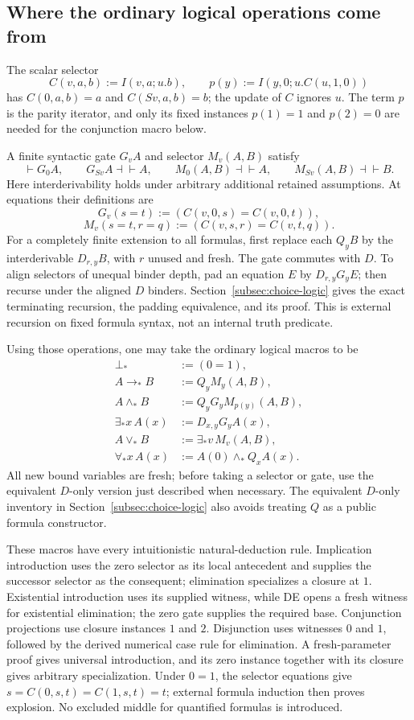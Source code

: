 \subsection{Where the ordinary logical operations come from}

The scalar selector
\[
 C(v,a,b):=I(v,a;u.b),\qquad
 p(y):=I(y,0;u.C(u,1,0))
\]
has $C(0,a,b)=a$ and $C(Sv,a,b)=b$; the update of $C$ ignores $u$.
The term $p$ is the parity iterator, and only its fixed instances
$p(1)=1$ and $p(2)=0$ are needed for the conjunction macro below.

A finite syntactic gate $G_vA$ and selector $M_v(A,B)$ satisfy
\[
 \vdash G_0A,\qquad G_{Sv}A\dashv\vdash A,
 \qquad M_0(A,B)\dashv\vdash A,
 \qquad M_{Sv}(A,B)\dashv\vdash B.
\]
Here interderivability holds under arbitrary additional retained assumptions.
At equations their definitions are
\[
 G_v(s=t):=(C(v,0,s)=C(v,0,t)),
\]
\[
 M_v(s=t,r=q):=(C(v,s,r)=C(v,t,q)).
\]
For a completely finite extension to all formulas, first replace each
$Q_yB$ by the interderivable $D_{r,y}B$, with $r$ unused and fresh.
The gate commutes with $D$. To align selectors of unequal binder depth,
pad an equation $E$ by $D_{r,y}G_yE$; then recurse under the aligned $D$
binders. Section~\ref{subsec:choice-logic} gives the exact terminating
recursion, the padding equivalence, and its proof. This is external recursion
on fixed formula syntax, not an internal truth predicate.

Using those operations, one may take the ordinary logical macros to be
\[
\begin{aligned}
 \bot_*&:=(0=1),\\
 A\mathbin{\to_*}B&:=Q_yM_y(A,B),\\
 A\mathbin{\wedge_*}B&:=Q_yG_yM_{p(y)}(A,B),\\
 \exists_*x\,A(x)&:=D_{x,y}G_yA(x),\\
 A\mathbin{\vee_*}B&:=\exists_*v\,M_v(A,B),\\
 \forall_*x\,A(x)&:=A(0)\mathbin{\wedge_*}Q_xA(x).
\end{aligned}
\]
All new bound variables are fresh; before taking a selector or gate, use
the equivalent $D$-only version just described when necessary.
The equivalent $D$-only inventory in Section~\ref{subsec:choice-logic}
also avoids treating $Q$ as a public formula constructor.

These macros have every intuitionistic natural-deduction rule. Implication
introduction uses the zero selector as its local antecedent and supplies the
successor selector as the consequent; elimination specializes a closure at
$1$. Existential introduction uses its supplied witness, while DE opens a
fresh witness for existential elimination; the zero gate supplies the required
base. Conjunction projections use closure instances $1$ and $2$. Disjunction
uses witnesses $0$ and $1$, followed by the derived numerical case rule for
elimination. A fresh-parameter proof gives universal introduction, and its
zero instance together with its closure gives arbitrary specialization.
Under $0=1$, the selector equations give
$s=C(0,s,t)=C(1,s,t)=t$; external formula induction then proves explosion.
No excluded middle for quantified formulas is introduced.

